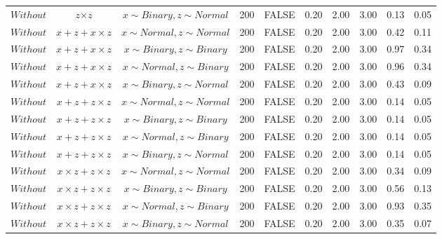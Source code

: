 \begin{table}[ht]
{\begin{tabular}{lccccccccc}
  $Without$ & $\textit{z} \times \textit{z}$ & $\textit{x} \sim Binary, \textit{z} \sim Normal$ & 200 & FALSE & 0.20 & 2.00 & 3.00 & 0.13 & 0.05 \\ 
  $Without$ & $\textit{x} + \textit{z} + \textit{x} \times \textit{z}$ & $\textit{x} \sim Normal , \textit{z} \sim Normal$ & 200 & FALSE & 0.20 & 2.00 & 3.00 & 0.42 & 0.11 \\ 
  $Without$ & $\textit{x} + \textit{z} + \textit{x} \times \textit{z}$ & $\textit{x} \sim Binary, \textit{z} \sim Binary$ & 200 & FALSE & 0.20 & 2.00 & 3.00 & 0.97 & 0.34 \\ 
  $Without$ & $\textit{x} + \textit{z} + \textit{x} \times \textit{z}$ & $\textit{x} \sim Normal, \textit{z} \sim Binary$ & 200 & FALSE & 0.20 & 2.00 & 3.00 & 0.96 & 0.34 \\ 
  $Without$ & $\textit{x} + \textit{z} + \textit{x} \times \textit{z}$ & $\textit{x} \sim Binary, \textit{z} \sim Normal$ & 200 & FALSE & 0.20 & 2.00 & 3.00 & 0.43 & 0.09 \\ 
  $Without$ & $\textit{x} + \textit{z} + \textit{z} \times \textit{z}$ & $\textit{x} \sim Normal , \textit{z} \sim Normal$ & 200 & FALSE & 0.20 & 2.00 & 3.00 & 0.14 & 0.05 \\ 
  $Without$ & $\textit{x} + \textit{z} + \textit{z} \times \textit{z}$ & $\textit{x} \sim Binary, \textit{z} \sim Binary$ & 200 & FALSE & 0.20 & 2.00 & 3.00 & 0.14 & 0.05 \\ 
  $Without$ & $\textit{x} + \textit{z} + \textit{z} \times \textit{z}$ & $\textit{x} \sim Normal, \textit{z} \sim Binary$ & 200 & FALSE & 0.20 & 2.00 & 3.00 & 0.14 & 0.05 \\ 
  $Without$ & $\textit{x} + \textit{z} + \textit{z} \times \textit{z}$ & $\textit{x} \sim Binary, \textit{z} \sim Normal$ & 200 & FALSE & 0.20 & 2.00 & 3.00 & 0.14 & 0.05 \\ 
  $Without$ & $\textit{x} \times \textit{z} + \textit{z} \times \textit{z}$ & $\textit{x} \sim Normal , \textit{z} \sim Normal$ & 200 & FALSE & 0.20 & 2.00 & 3.00 & 0.34 & 0.09 \\ 
  $Without$ & $\textit{x} \times \textit{z} + \textit{z} \times \textit{z}$ & $\textit{x} \sim Binary, \textit{z} \sim Binary$ & 200 & FALSE & 0.20 & 2.00 & 3.00 & 0.56 & 0.13 \\ 
  $Without$ & $\textit{x} \times \textit{z} + \textit{z} \times \textit{z}$ & $\textit{x} \sim Normal, \textit{z} \sim Binary$ & 200 & FALSE & 0.20 & 2.00 & 3.00 & 0.93 & 0.35 \\ 
  $Without$ & $\textit{x} \times \textit{z} + \textit{z} \times \textit{z}$ & $\textit{x} \sim Binary, \textit{z} \sim Normal$ & 200 & FALSE & 0.20 & 2.00 & 3.00 & 0.35 & 0.07 \\ 

\end{tabular}}
\end{table}
